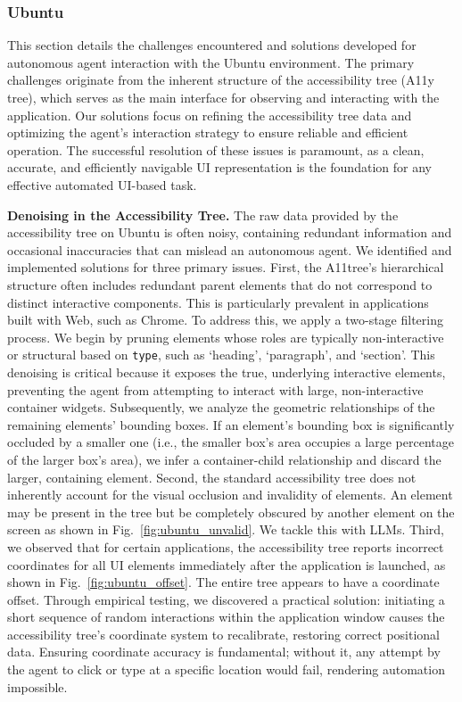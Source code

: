 \subsubsection{Ubuntu}
This section details the challenges encountered and solutions developed for autonomous agent interaction with the Ubuntu environment. The primary challenges originate from the inherent structure of the accessibility tree (A11y tree), which serves as the main interface for observing and interacting with the application. Our solutions focus on refining the accessibility tree data and optimizing the agent's interaction strategy to ensure reliable and efficient operation. The successful resolution of these issues is paramount, as a clean, accurate, and efficiently navigable UI representation is the foundation for any effective automated UI-based task.

\textbf{Denoising in the Accessibility Tree.} 
%
The raw data provided by the accessibility tree on Ubuntu is often noisy, containing redundant information and occasional inaccuracies that can mislead an autonomous agent. We identified and implemented solutions for three primary issues. First, the A11tree's hierarchical structure often includes redundant parent elements that do not correspond to distinct interactive components. This is particularly prevalent in applications built with Web, such as Chrome. To address this, we apply a two-stage filtering process. 
%
We begin by pruning elements whose roles are typically non-interactive or structural based on \texttt{type}, such as `heading', `paragraph', and `section'.
%
This denoising is critical because it exposes the true, underlying interactive elements, preventing the agent from attempting to interact with large, non-interactive container widgets.
%
Subsequently, we analyze the geometric relationships of the remaining elements' bounding boxes. If an element's bounding box is significantly occluded by a smaller one (i.e., the smaller box's area occupies a large percentage of the larger box's area), we infer a container-child relationship and discard the larger, containing element. 
%
Second, the standard accessibility tree does not inherently account for the visual occlusion and invalidity of elements. An element may be present in the tree but be completely obscured by another element on the screen as shown in Fig.~\ref{fig:ubuntu_unvalid}. We tackle this with LLMs. 
%
Third, we observed that for certain applications, the accessibility tree reports incorrect coordinates for all UI elements immediately after the application is launched, as shown in Fig.~\ref{fig:ubuntu_offset}. The entire tree appears to have a coordinate offset. Through empirical testing, we discovered a practical solution: initiating a short sequence of random interactions within the application window causes the accessibility tree's coordinate system to recalibrate, restoring correct positional data. Ensuring coordinate accuracy is fundamental; without it, any attempt by the agent to click or type at a specific location would fail, rendering automation impossible.

